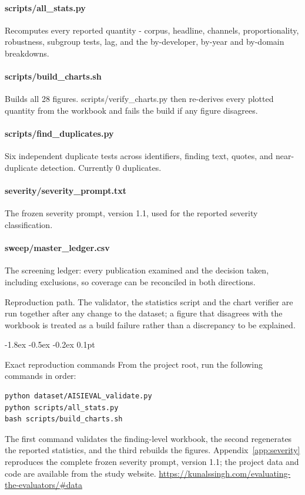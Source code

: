 \documentclass{article}
\makeatletter
\renewcommand{\subsection}{%
  \@startsection{subsection}{2}{\z@}%
                {-1.8ex \@plus -0.5ex \@minus -0.2ex}%
                {0.1pt}%
                {\normalsize\bf\raggedright}%
}
\makeatother
\begin{document}
\paragraph{scripts/all\_stats.py}
Recomputes every reported quantity - corpus, headline, channels, proportionality, robustness, subgroup tests, lag, and the by-developer, by-year and by-domain breakdowns.

\paragraph{scripts/build\_charts.sh}
Builds all 28 figures. scripts/verify\_charts.py then re-derives every plotted quantity from the workbook and fails the build if any figure disagrees.

\paragraph{scripts/find\_duplicates.py}
Six independent duplicate tests across identifiers, finding text, quotes, and near-duplicate detection. Currently 0 duplicates.

\paragraph{severity/severity\_prompt.txt}
The frozen severity prompt, version 1.1, used for the reported severity classification.

\paragraph{sweep/master\_ledger.csv}
The screening ledger: every publication examined and the decision taken, including exclusions, so coverage can be reconciled in both directions.

Reproduction path. The validator, the statistics script and the chart verifier are run together after any change to the dataset; a figure that disagrees with the workbook is treated as a build failure rather than a discrepancy to be explained.

\subsection{Exact reproduction commands}
From the project root, run the following commands in order:

\begin{verbatim}
python dataset/AISIEVAL_validate.py
python scripts/all_stats.py
bash scripts/build_charts.sh
\end{verbatim}

The first command validates the finding-level workbook, the second regenerates the reported statistics, and the third rebuilds the figures. Appendix~\ref{app:severity} reproduces the complete frozen severity prompt, version 1.1; the project data and code are available from the study website. \url{https://kunalssingh.com/evaluating-the-evaluators/\#data}
\end{document}
